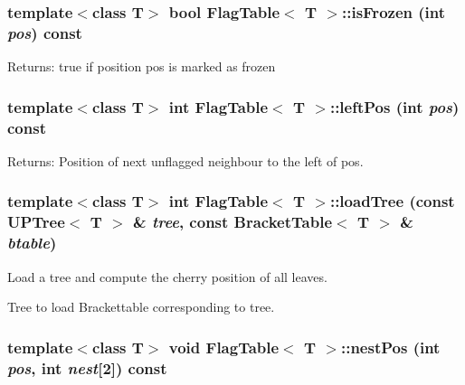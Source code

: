 \subsubsection{\setlength{\rightskip}{0pt plus 5cm}template$<$class T$>$ bool {\bf Flag\-Table}$<$ T $>$::is\-Frozen (int {\em pos}) const\hspace{0.3cm}{\tt  [inline]}}\label{classFlagTable_a14}


\begin{Desc}
\item[Returns:]true if position pos is marked as frozen \end{Desc}
\subsubsection{\setlength{\rightskip}{0pt plus 5cm}template$<$class T$>$ int {\bf Flag\-Table}$<$ T $>$::left\-Pos (int {\em pos}) const\hspace{0.3cm}{\tt  [inline]}}\label{classFlagTable_a7}


\begin{Desc}
\item[Returns:]Position of next unflagged neighbour to the left of pos. \end{Desc}
\subsubsection{\setlength{\rightskip}{0pt plus 5cm}template$<$class T$>$ int {\bf Flag\-Table}$<$ T $>$::load\-Tree (const {\bf UPTree}$<$ T $>$ \& {\em tree}, const {\bf Bracket\-Table}$<$ T $>$ \& {\em btable})}\label{classFlagTable_a5}


Load a tree and compute the cherry position of all leaves. 

Tree to load  Brackettable corresponding to tree. 
\subsubsection{\setlength{\rightskip}{0pt plus 5cm}template$<$class T$>$ void {\bf Flag\-Table}$<$ T $>$::nest\-Pos (int {\em pos}, int {\em nest}[2]) const}\label{classFlagTable_a18}


